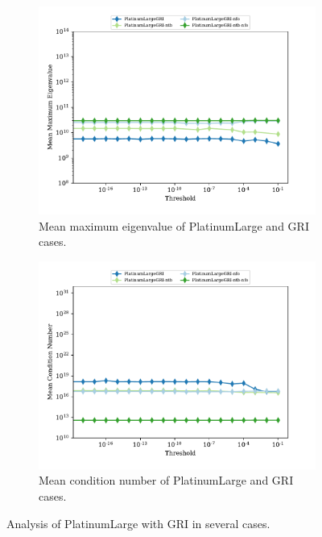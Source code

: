 \documentclass{article}
\begin{document}
\begin{figure}[htb]
    \begin{subfigure}{0.49\textwidth}
        \centering
        \includegraphics[width=\textwidth]{figures/max_eigen_gri_large.pdf}
        \caption{Mean maximum eigenvalue of PlatinumLarge and GRI cases.}
        \label{fig:gri_large_me}
    \end{subfigure}
    \hfill
    \begin{subfigure}{0.49\textwidth}
        \centering
        \includegraphics[width=\textwidth]{figures/condition_gri_large.pdf}
        \caption{Mean condition number of PlatinumLarge and GRI cases.}
        \label{fig:gri_large_iters}
    \end{subfigure}
    \hfill
    \caption{Analysis of PlatinumLarge with GRI in several cases.}
    \label{fig:gri_large}
\end{figure}
\end{document}
